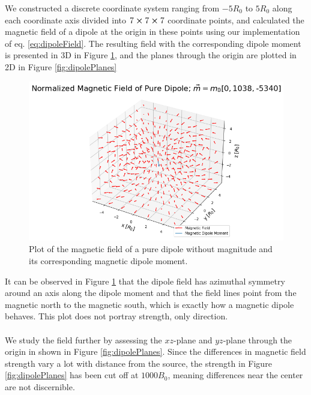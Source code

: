 We constructed a discrete coordinate system ranging from $-5R_0$ to $5R_0$ along each coordinate axis divided into $7\cross 7\cross 7$ coordinate points, and calculated the magnetic field of a dipole at the origin in these points using our implementation of eq. \ref{eq:dipoleField}. The resulting field with the corresponding dipole moment is presented in 3D in Figure \ref{fig:dipoleField}, and the planes through the origin are plotted in 2D in Figure \ref{fig:dipolePlanes}\\

\begin{figure}[H]
    \centering
    \includegraphics[scale=.4]{Images/dipoleField.png}
    \caption{Plot of the magnetic field of a pure dipole without magnitude and its corresponding magnetic dipole moment.}
    \label{fig:dipoleField}
\end{figure}

\noindent It can be observed in Figure \ref{fig:dipoleField} that the dipole field has azimuthal symmetry around an axis along the dipole moment and that the field lines point from the magnetic north to the magnetic south, which is exactly how a magnetic dipole behaves. This plot does not portray strength, only direction.\\
\\
We study the field further by assessing the $xz$-plane and $yz$-plane through the origin in shown in Figure \ref{fig:dipolePlanes}. Since the differences in magnetic field strength vary a lot with distance from the source, the strength in Figure \ref{fig:dipolePlanes} has been cut off at $1000B_0$, meaning differences near the center are not discernible.\\

